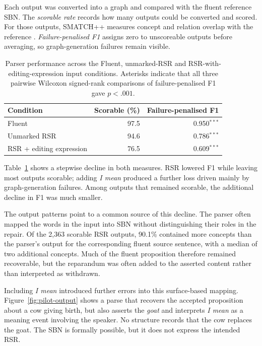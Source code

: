 \documentclass{article}
\begin{document}
Each output was converted into a graph and compared with the fluent reference
SBN. The \emph{scorable rate} records how many outputs could be converted and
scored. For those outputs, SMATCH++ measures concept and relation overlap with
the reference \citep{opitzSMATCHStandardizedExtended2023}.
\emph{Failure-penalised F1} assigns zero to unscoreable outputs before averaging,
so graph-generation failures remain visible.

\begin{table}[htbp]
\centering
\small
\begin{tabular}{lrr}
\toprule
Condition & Scorable (\%) & Failure-penalised F1 \\
\midrule
Fluent      & 97.5 & 0.950$^{***}$ \\
Unmarked RSR & 94.6 & 0.786$^{***}$ \\
RSR + editing expression & 76.5 & 0.609$^{***}$ \\
\bottomrule
\end{tabular}
\caption{Parser performance across the Fluent, unmarked-RSR and
RSR-with-editing-expression input conditions. Asterisks indicate that all
three pairwise Wilcoxon signed-rank comparisons of failure-penalised F1 gave
$p<.001$.}
\label{tab:pilot}
\end{table}

Table~\ref{tab:pilot} shows a stepwise decline in both measures.
RSR lowered F1 while leaving most outputs scorable; adding \textit{I mean}
produced a further loss driven mainly by graph-generation failures. Among
outputs that remained scorable, the additional decline in F1 was much smaller.

The output patterns point to a common source of this decline. The parser often
mapped the words in the input into SBN without distinguishing their roles in
the repair. Of the 2,363 scorable RSR outputs, 90.1\% contained more concepts
than the parser's output for the corresponding fluent source sentence, with a median
of two additional concepts. Much of the fluent proposition therefore remained
recoverable, but the reparandum was often added to the asserted content rather
than interpreted as withdrawn.

Including \textit{I mean} introduced further errors into this surface-based
mapping.
Figure~\ref{fig:pilot-output} shows a parse that recovers the accepted
proposition about a cow giving birth, but also asserts the \textit{goat} and
interprets \textit{I mean} as a meaning event involving the speaker. No
structure records that the cow replaces the goat. The SBN is formally
possible, but it does not express the intended RSR.
\end{document}
